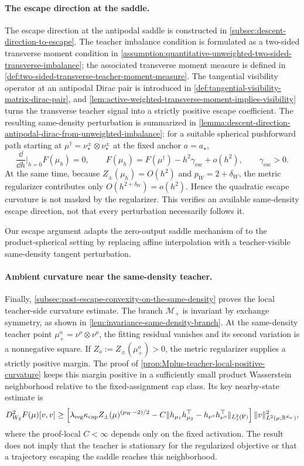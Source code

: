 \paragraph{The escape direction at the saddle.}
The escape direction at the antipodal saddle is constructed in
\cref{subsec:descent-direction-to-escape}.  The teacher imbalance condition is
formulated as a two-sided transverse moment condition in
\cref{assumption:quantitative-unweighted-two-sided-transverse-imbalance}; the
associated transverse moment measure is defined in
\cref{def:two-sided-transverse-teacher-moment-measure}.  The tangential visibility
operator at an antipodal Dirac pair is introduced in
\cref{def:tangential-visibility-matrix-dirac-pair}, and
\cref{lem:active-weighted-transverse-moment-implies-visibility} turns the
transverse teacher signal into a strictly positive escape coefficient.  The
resulting same-density perturbation is summarized in
\cref{lemma:descent-direction-antipodal-dirac-from-unweighted-imbalance}: for a
suitable spherical pushforward path starting at
\(\mu^\dagger=\nu_{\star}^\pm\otimes\nu_{\star}^\pm\) at the fixed anchor
\(a=a_\star\),
\[
    \frac{\dd}{\dd h}\bigg|_{h=0}F(\mu_h)=0,
    \qquad
    F(\mu_h)
    =
    F(\mu^\dagger)
    -
    h^2\gamma_{\mathrm{esc}}
    +
    o(h^2),
    \qquad
    \gamma_{\mathrm{esc}}>0 .
\]
At the same time, because \(Z_\pm(\mu_h)=O(h^2)\) and \(p_W=2+\delta_W\), the
metric regularizer contributes only \(O(h^{2+\delta_W})=o(h^2)\).  Hence the
quadratic escape curvature is not masked by the regularizer. This verifies an available same-density escape direction, not that every
perturbation necessarily follows it.

Our escape argument adapts the zero-output saddle mechanism of
\citet{yamamoto2025hessianguided} to the product-spherical setting by replacing
affine interpolation with a teacher-visible same-density tangent perturbation.

\paragraph{Ambient curvature near the same-density teacher.}
Finally, \cref{subsec:post-escape-convexity-on-the-same-density} proves the
local teacher-side curvature estimate. The branch \(\mathcal M_+\) is
invariant by exchange symmetry, as shown in
\cref{lem:invariance-same-density-branch}. At the same-density teacher point
\(\mu_+^o=\nu^o\otimes\nu^o\), the fitting residual vanishes and its second
variation is a nonnegative square. If
\(Z_o:=Z_\pm(\mu_+^o)>0\), the metric regularizer supplies a strictly positive
margin. The proof of \cref{prop:Mplus-teacher-local-positive-curvature} keeps
this margin positive in a sufficiently small product Wasserstein neighborhood
relative to the fixed-assignment cap class. Its key nearby-state estimate is
\[
 D_{W_2}^2F(\mu)[v,v]
 \ge
 \left[
 \lambda_{\mathrm{reg}}\kappa_{\mathrm{cap}}Z_\pm(\mu)^{(p_W-2)/2}
 -C\|h_{\mu_1}h_{\mu_2}^{\top}
          -h_{\nu^o}h_{\nu^o}^{\top}\|_{L^2_z(\mathrm F)}
 \right]\|v\|_{L^2(\mu;\mathbb R^{d_w})}^2,
\]
where the proof-local \(C<\infty\) depends only on the fixed activation.
The result does not imply that the teacher is stationary for the regularized
objective or that a trajectory escaping the saddle reaches this neighborhood.
